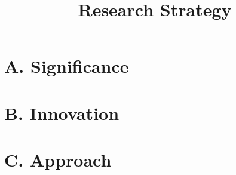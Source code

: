 \newpage
\title{Research Strategy}

\section*{A. Significance}


\section*{B. Innovation}


\section*{C. Approach}


